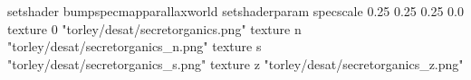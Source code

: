 setshader bumpspecmapparallaxworld
setshaderparam specscale 0.25 0.25 0.25 0.0
texture 0 "torley/desat/secretorganics.png"
texture n "torley/desat/secretorganics_n.png"
texture s "torley/desat/secretorganics_s.png"
texture z "torley/desat/secretorganics_z.png"

